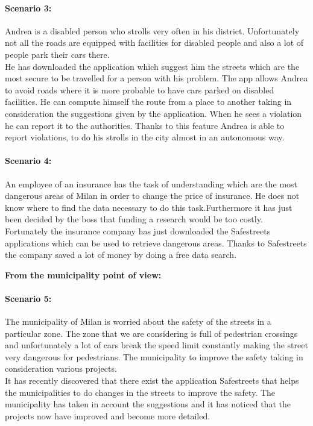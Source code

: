 \documentclass[titlepage]{article}
\begin{document}
\paragraph{Scenario 3:}Andrea is a disabled person who strolls very often in his district. Unfortunately not all the roads are equipped with facilities for disabled people and also a lot of people park their cars there.\\
He has downloaded the application which suggest him the streets which are the most secure to be travelled for a person with his problem. The app allows Andrea to avoid roads where it is more probable to have cars parked on disabled facilities. He can compute himself the route from a place to another taking in consideration the suggestions given by the application. When he sees a violation he can report it to the authorities. Thanks to this feature Andrea is able to report violations, to do his strolls in the city almost in an autonomous way.
\paragraph{Scenario 4:} An employee of an insurance has the task of understanding which are the most dangerous areas of Milan in order to change the price of insurance. He does not know where to find the data necessary to do this task.Furthermore it has just been decided by the boss that funding a research would be too costly.\\
Fortunately the insurance company has just downloaded the Safestreets applications which can be used to retrieve dangerous areas. Thanks to Safestreets the company saved a lot of money by doing a free data search.\newpage
\begin{center}
	\textbf{From the municipality point of view:}
\end{center}
\paragraph{Scenario 5:} The municipality of Milan is worried about the safety of the streets in a particular zone. The zone that we are considering is full of pedestrian crossings and unfortunately a lot of cars break  the speed limit constantly making the street very dangerous for pedestrians. The municipality to improve the safety taking in consideration various projects.\\
It has recently discovered that there exist the application Safestreets that helps the municipalities to do changes in the streets to improve the safety. The municipality has taken in account the suggestions and it has noticed that the projects now have improved and become more detailed.
\end{document}
